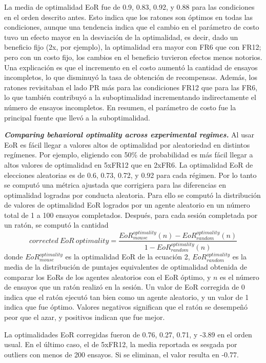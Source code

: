 \documentclass[a4paper,12pt]{article}
\begin{document}
La media de optimalidad EoR fue de 0.9, 0.83, 0.92, y 0.88 para las condiciones en el orden descrito antes. Esto indica que los ratones son óptimos en todas las condiciones, aunque una tendencia indica que el cambio en el parámetro de costo tuvo un efecto mayor en la desviación de la optimalidad, es decir, dado un beneficio fijo (2x, por ejemplo), la optimalidad era mayor con FR6 que con FR12; pero con un costo fijo, los cambios en el beneficio tuvieron efectos menos notorios. Una explicación es que el incremento en el costo aumentó la cantidad de ensayos incompletos, lo que disminuyó la tasa de obtención de recompensas. Además, los ratones revisitaban el lado PR más para las condiciones FR12 que para las FR6, lo que también contribuyó a la suboptimalidad incrementando indirectamente el número de ensayos incompletos. En resumen, el parámetro de costo fue la principal fuente que llevó a la suboptimalidad.

{\itshape\bfseries Comparing behavioral optimality across experimental regimes.} Al usar EoR es fácil llegar a valores altos de optimalidad por aleatoriedad en distintos regímenes. Por ejemplo, eligiendo con 50\% de probabilidad es más fácil llegar a altos valores de optimalidad en 5xFR12 que en 2xFR6. La optimalidad EoR de elecciones aleatorias es de 0.6, 0.73, 0.72, y 0.92 para cada régimen. Por lo tanto se computó una métrica ajustada que corrigiera para las diferencias en optimalidad logradas por conducta aleatoria. Para ello se computó la distribución de valores de optimalidad EoR logrados por un agente aleatorio en un número total de 1 a 100 ensayos completados. Después, para cada sesión completada por un ratón, se computó la cantidad 
\begin{equation}
	corrected\ EoR\ optimality =
	\frac{
		EoR_{mouse}^{optimality}(n)
		-
		EoR_{random}^{optimality}(n)
	}{
		1
		-
		EoR_{random}^{optimality}(n)
	}
\end{equation}
donde $EoR_{mouse}^{optimality}$ es la optimalidad EoR de la ecuación 2, $EoR_{random}^{optimality}$ es la media de la distribución de puntajes equivalentes de optimalidad obtenida de comparar los EoRs de los agentes aleatorios con el EoR óptimo, y $n$ es el número de ensayos que un ratón realizó en la sesión. Un valor de EoR corregida de 0 indica que el ratón ejecutó tan bien como un agente aleatorio, y un valor de 1 indica que fue óptimo.  Valores negativos significan que el ratón se desempeñó peor que el azar, y positivos indican que fue mejor.

La optimalidades EoR corregidas fueron de 0.76, 0.27, 0.71, y -3.89 en el orden usual. En el último caso, el de 5xFR12, la media reportada es sesgada por outliers con menos de 200 ensayos. Si se eliminan, el valor resulta en -0.77.
\end{document}
